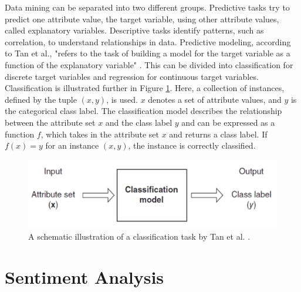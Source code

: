 Data mining can be separated into two different groups. Predictive tasks try to predict one attribute value, the target variable, using other attribute values, called explanatory variables. Descriptive tasks identify patterns, such as correlation, to understand relationships in data. Predictive modeling, according to Tan et al., "refers to the task of building a model for the target variable as a function of the explanatory variable" \cite[p.~29]{DBLP:books/aw/TanSKK2019}. This can be divided into classification for discrete target variables and regression for continuous target variables. Classification is illustrated further in Figure \ref{fig:classifiation}. Here, a collection of instances, defined by the tuple $(x,y)$, is used. $x$ denotes a set of attribute values, and $y$ is the categorical class label. The classification model describes the relationship between the attribute set $x$ and the class label $y$ and can be expressed as a function $f$, which takes in the attribute set $x$ and returns a class label. If $f(x) = y$ for an instance $(x,y)$, the instance is correctly classified.
\begin{figure}
    \centering
    \includegraphics[scale = 0.6]{Images/classification.png}
    \caption{A schematic illustration of a classification task by Tan et al. \cite[p.~134]{DBLP:books/aw/TanSKK2019}.}
    \label{fig:classifiation}
\end{figure}



\section{Sentiment Analysis}


